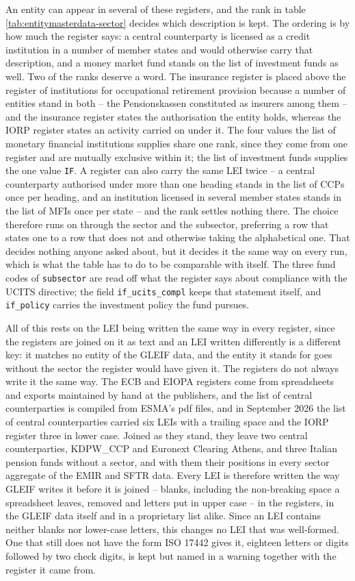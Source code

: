 An entity can appear in several of these registers, and the rank in table \ref{tab:entitymasterdata-sector} decides which description is kept. The ordering is by how much the register says: a central counterparty is licensed as a credit institution in a number of member states and would otherwise carry that description, and a money market fund stands on the list of investment funds as well. Two of the ranks deserve a word. The insurance register is placed above the register of institutions for occupational retirement provision because a number of entities stand in both -- the Pensionskassen constituted as insurers among them -- and the insurance register states the authorisation the entity holds, whereas the IORP register states an activity carried on under it. The four values the list of monetary financial institutions supplies share one rank, since they come from one register and are mutually exclusive within it; the list of investment funds supplies the one value \verb|IF|. A register can also carry the same LEI twice -- a central counterparty authorised under more than one heading stands in the list of CCPs once per heading, and an institution licensed in several member states stands in the list of MFIs once per state -- and the rank settles nothing there. The choice therefore runs on through the sector and the subsector, preferring a row that states one to a row that does not and otherwise taking the alphabetical one. That decides nothing anyone asked about, but it decides it the same way on every run, which is what the table has to do to be comparable with itself. The three fund codes of \texttt{subsector} are read off what the register says about compliance with the UCITS directive; the field \texttt{if\_ucits\_compl} keeps that statement itself, and \texttt{if\_policy} carries the investment policy the fund pursues.

All of this rests on the LEI being written the same way in every register, since the registers are joined on it as text and an LEI written differently is a different key: it matches no entity of the GLEIF data, and the entity it stands for goes without the sector the register would have given it. The registers do not always write it the same way. The ECB and EIOPA registers come from spreadsheets and exports maintained by hand at the publishers, and the list of central counterparties is compiled from ESMA's pdf files, and in September 2026 the list of central counterparties carried six LEIs with a trailing space and the IORP register three in lower case. Joined as they stand, they leave two central counterparties, KDPW\_CCP and Euronext Clearing Athens, and three Italian pension funds without a sector, and with them their positions in every sector aggregate of the EMIR and SFTR data. Every LEI is therefore written the way GLEIF writes it before it is joined -- blanks, including the non-breaking space a spreadsheet leaves, removed and letters put in upper case -- in the registers, in the GLEIF data itself and in a proprietary list alike. Since an LEI contains neither blanks nor lower-case letters, this changes no LEI that was well-formed. One that still does not have the form ISO 17442 gives it, eighteen letters or digits followed by two check digits, is kept but named in a warning together with the register it came from.

